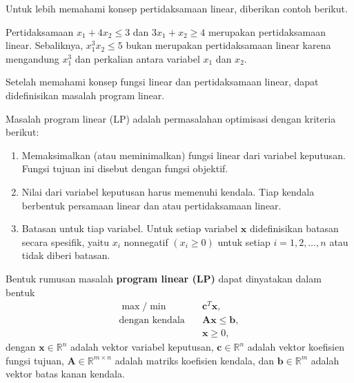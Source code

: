 Untuk lebih memahami konsep pertidaksamaan linear, diberikan contoh berikut.
\begin{contoh}
    Pertidaksamaan $x_1+4x_2\leq 3$ dan $3x_1+x_2\geq 4$ merupakan pertidaksamaan linear. Sebaliknya, $x_1^3x_2\leq 5$ bukan merupakan pertidaksamaan linear karena mengandung $x_1^3$ dan perkalian antara variabel $x_1$ dan $x_2$.
\end{contoh}

Setelah memahami konsep fungsi linear dan pertidaksamaan linear, dapat didefinisikan masalah program linear.
    \begin{definisi}
    Masalah program linear (LP) adalah permasalahan optimisasi dengan kriteria berikut:
    \begin{enumerate}
        \item Memaksimalkan (atau meminimalkan) fungsi linear dari variabel keputusan. Fungsi tujuan ini disebut dengan fungsi objektif.
        \item Nilai dari variabel keputusan harus memenuhi kendala. Tiap kendala berbentuk persamaan linear dan atau pertidaksamaan linear.
        \item Batasan untuk tiap variabel. Untuk setiap variabel $\boldsymbol{x}$ didefinisikan batasan secara spesifik, yaitu $x_i$ nonnegatif $(x_i\geq 0)$ untuk setiap $i=1,2,\ldots, n$ atau tidak diberi batasan.
    \end{enumerate}

    Bentuk rumusan masalah \textbf{program linear (LP)} dapat dinyatakan dalam bentuk
    \begin{align*}
        \max/\min \quad & \boldsymbol{c}^T \boldsymbol{x}, \\
        \text{dengan kendala} \quad & \boldsymbol{Ax} \leq \boldsymbol{b}, \\
        & \boldsymbol{x} \geq 0,
    \end{align*}
    dengan $\textbf{x} \in \mathbb{R}^n$ adalah vektor variabel keputusan, $\textbf{c} \in \mathbb{R}^n$ adalah vektor koefisien fungsi tujuan, $\textbf{A} \in \mathbb{R}^{m \times n}$ adalah matriks koefisien kendala, dan $\textbf{b} \in \mathbb{R}^m$ adalah vektor batas kanan kendala.
\end{definisi}

